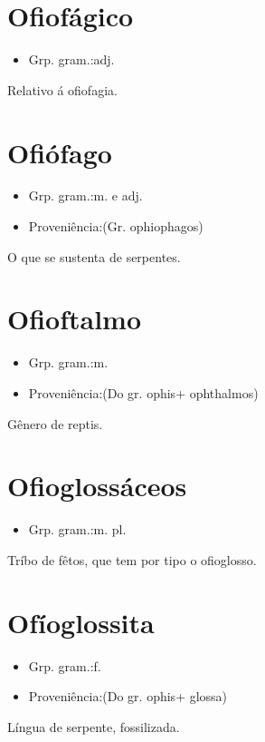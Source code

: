 \section{Ofiofágico}
\begin{itemize}
\item {Grp. gram.:adj.}
\end{itemize}
Relativo á ofiofagia.
\section{Ofiófago}
\begin{itemize}
\item {Grp. gram.:m.  e  adj.}
\end{itemize}
\begin{itemize}
\item {Proveniência:(Gr. \textunderscore ophiophagos\textunderscore )}
\end{itemize}
O que se sustenta de serpentes.
\section{Ofioftalmo}
\begin{itemize}
\item {Grp. gram.:m.}
\end{itemize}
\begin{itemize}
\item {Proveniência:(Do gr. \textunderscore ophis\textunderscore  + \textunderscore ophthalmos\textunderscore )}
\end{itemize}
Gênero de reptis.
\section{Ofioglossáceos}
\begin{itemize}
\item {Grp. gram.:m. pl.}
\end{itemize}
Tríbo de fêtos, que tem por tipo o ofioglosso.
\section{Ofíoglossita}
\begin{itemize}
\item {Grp. gram.:f.}
\end{itemize}
\begin{itemize}
\item {Proveniência:(Do gr. \textunderscore ophis\textunderscore  + \textunderscore glossa\textunderscore )}
\end{itemize}
Língua de serpente, fossilizada.
